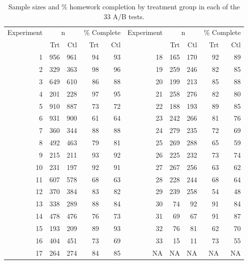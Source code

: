 \begin{table}

\caption{\label{tab:info}Sample sizes and \% homework completion by treatment group in each of the 33 A/B tests.}
\centering
\begin{tabular}[t]{r|r|r|r|>{}r||r|r|r|r|r}
\hline
\multicolumn{1}{c|}{Experiment} & \multicolumn{2}{c|}{n} & \multicolumn{2}{c|}{\% Complete} & \multicolumn{1}{c|}{Experiment} & \multicolumn{2}{c|}{n} & \multicolumn{2}{c}{\% Complete} \\
\cline{1-1} \cline{2-3} \cline{4-5} \cline{6-6} \cline{7-8} \cline{9-10}
 & Trt & Ctl & Trt & Ctl &  & Trt & Ctl & Trt & Ctl\\
\hline
1 & 956 & 961 & 94 & 93 & 18 & 165 & 170 & 92 & 89\\
\hline
2 & 329 & 363 & 98 & 96 & 19 & 259 & 246 & 82 & 85\\
\hline
3 & 649 & 610 & 86 & 88 & 20 & 199 & 213 & 85 & 88\\
\hline
4 & 201 & 228 & 97 & 95 & 21 & 258 & 276 & 82 & 80\\
\hline
5 & 910 & 887 & 73 & 72 & 22 & 188 & 193 & 89 & 85\\
\hline
6 & 931 & 900 & 61 & 64 & 23 & 242 & 266 & 81 & 76\\
\hline
7 & 360 & 344 & 88 & 88 & 24 & 279 & 235 & 72 & 69\\
\hline
8 & 492 & 463 & 79 & 81 & 25 & 269 & 288 & 65 & 59\\
\hline
9 & 215 & 211 & 93 & 92 & 26 & 225 & 232 & 73 & 74\\
\hline
10 & 231 & 197 & 92 & 91 & 27 & 267 & 256 & 63 & 62\\
\hline
11 & 607 & 578 & 68 & 63 & 28 & 228 & 244 & 68 & 64\\
\hline
12 & 370 & 384 & 83 & 82 & 29 & 239 & 258 & 54 & 48\\
\hline
13 & 338 & 289 & 88 & 84 & 30 & 74 & 92 & 91 & 84\\
\hline
14 & 478 & 476 & 76 & 73 & 31 & 69 & 67 & 91 & 87\\
\hline
15 & 193 & 209 & 89 & 93 & 32 & 76 & 81 & 62 & 70\\
\hline
16 & 404 & 451 & 73 & 69 & 33 & 15 & 11 & 73 & 55\\
\hline
17 & 264 & 274 & 84 & 85 & NA & NA & NA & NA & NA\\
\hline
\end{tabular}
\end{table}